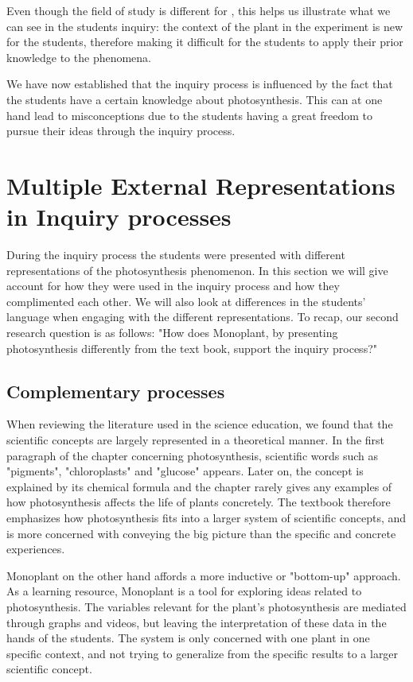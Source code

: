 Even though the field of study is different for \citeauthor{klahr1993heuristics}, this helps us illustrate what we can see in the students inquiry: the context of the plant in the experiment is new for the students, therefore making it difficult for the students to apply their prior knowledge to the phenomena. 

We have now established that the inquiry process is influenced by the fact that the students have a certain knowledge about photosynthesis. This can at one hand lead to misconceptions due to the students having a great freedom to pursue their ideas through the inquiry process. 







\section{Multiple External Representations in Inquiry processes}
During the inquiry process the students were presented with different representations of the photosynthesis phenomenon. In this section we will give account for how they were used in the inquiry process and how they complimented each other. We will also look at differences in the students' language when engaging with the different representations. To recap, our second research question is as follows: "How does Monoplant, by presenting photosynthesis differently from the text book, support the inquiry process?"

\subsection{Complementary processes}
When reviewing the literature used in the science education, we found that the scientific concepts are largely represented in a theoretical manner. In the first paragraph of the chapter concerning photosynthesis, scientific words such as "pigments", "chloroplasts" and "glucose" appears. Later on, the concept is explained by its chemical formula and the chapter rarely gives any examples of how photosynthesis affects the life of plants concretely. The textbook therefore emphasizes how photosynthesis fits into a larger system of scientific concepts, and is more concerned with conveying the big picture than the specific and concrete experiences. 

Monoplant on the other hand affords a more inductive or "bottom-up" approach. As a learning resource, Monoplant is a tool for exploring ideas related to photosynthesis. The variables relevant for the plant's photosynthesis are mediated through graphs and videos, but leaving the interpretation of these data in the hands of the students. The system is only concerned with one plant in one specific context, and not trying to generalize from the specific results to a larger scientific concept. 

